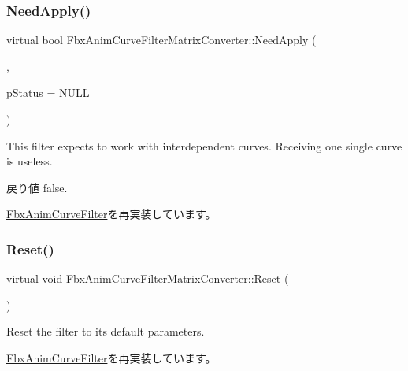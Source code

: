 \subsubsection{\texorpdfstring{Need\+Apply()}{NeedApply()}\hspace{0.1cm}{\footnotesize\ttfamily [6/6]}}
{\footnotesize\ttfamily virtual bool Fbx\+Anim\+Curve\+Filter\+Matrix\+Converter\+::\+Need\+Apply (\begin{DoxyParamCaption}\item[{\hyperlink{class_fbx_anim_curve}{Fbx\+Anim\+Curve} \&}]{,  }\item[{\hyperlink{class_fbx_status}{Fbx\+Status} $\ast$}]{p\+Status = {\ttfamily \hyperlink{fbxarch_8h_a070d2ce7b6bb7e5c05602aa8c308d0c4}{N\+U\+LL}} }\end{DoxyParamCaption})\hspace{0.3cm}{\ttfamily [virtual]}}

This filter expects to work with interdependent curves. Receiving one single curve is useless. \begin{DoxyReturn}{戻り値}
{\ttfamily false}. 
\end{DoxyReturn}


\hyperlink{class_fbx_anim_curve_filter_af768a9c47e4f5a5fff47a8ec781e6b4c}{Fbx\+Anim\+Curve\+Filter}を再実装しています。

\mbox{\label{class_fbx_anim_curve_filter_matrix_converter_ad441f2753722fa3fd07631fb249afadb}} 
\subsubsection{\texorpdfstring{Reset()}{Reset()}}
{\footnotesize\ttfamily virtual void Fbx\+Anim\+Curve\+Filter\+Matrix\+Converter\+::\+Reset (\begin{DoxyParamCaption}{ }\end{DoxyParamCaption})\hspace{0.3cm}{\ttfamily [virtual]}}

Reset the filter to its default parameters. 

\hyperlink{class_fbx_anim_curve_filter_a57fb35baaaa85adb08946383cf40e811}{Fbx\+Anim\+Curve\+Filter}を再実装しています。

\mbox{\label{class_fbx_anim_curve_filter_matrix_converter_a67f6df28fee3f4703d96a2f92d58dfe2}} 

